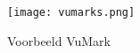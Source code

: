 \documentclass[fleqn,a4paper,12pt]{book}
\begin{document}
   \begin{figure}
       \texttt{[image: vumarks.png]}
       \caption{Voorbeeld VuMark}
       \label{fig:vumarks}
   \end{figure}
\end{document}
